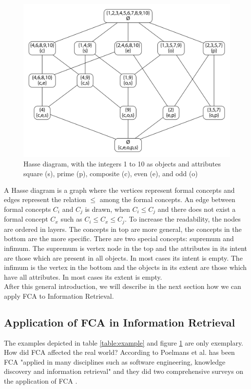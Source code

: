 \documentclass[11pt]{report}
\begin{document}
\begin{figure}[!ht]
	\centering
	\includegraphics[width=\linewidth]{./images/fcaExample}
\caption{Hasse diagram, with the integers 1 to 10 as objects and attributes square (s), prime (p), composite (c), even (e), and odd (o)}
\label{figure:example}
\end{figure}

A Hasse diagram is a graph where the vertices represent formal concepts and edges represent the relation $\le$ among the formal concepts. An edge between formal concepts $C_i$ and $C_j$ is drawn, when $C_i \le C_j$ and there does not exist a formal concept $C_x$ such as $C_i \le C_x \le C_j$. To increase the readability, the nodes are ordered in layers. The concepts in top are more general, the concepts in the bottom are the more specific. There are two special concepts: supremum and infimum. The supremum is vertex node in the top and the attributes in its intent are those which are present in all objects. In most cases its intent is empty. The infimum is the vertex in the bottom and the objects in its extent are those which have all attributes. In most cases its extent is empty.\\

After this general introduction, we will describe in the next section how we can apply FCA to Information Retrieval.

\subsection{Application of FCA in Information Retrieval}

The examples depicted in table \ref{table:example} and figure \ref{figure:example} are only exemplary. How did FCA affected the real world? According to Poelmans et al. has been FCA "applied in many disciplines such as software engineering, knowledge discovery and information retrieval" \cite{Poelmans2013} and they did two comprehensive surveys on the application of FCA \cite{Poelmans2013, Poelmans2013b}. \\
\end{document}
